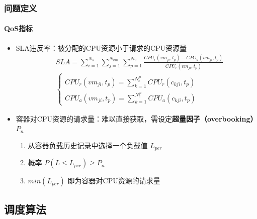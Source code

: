 \begin{frame}
\frametitle{问题定义}
\framesubtitle{QoS指标}
\begin{itemize}
    \item SLA违反率：被分配的CPU资源小于请求的CPU资源量
    \begin{equation}
    \begin{align*}
        &SLA = \sum_{i=1}^{N_s}\sum_{j=1}^{N_{vm}}\sum_{p=1}^{N_v}
        \frac{CPU_r(vm_{ji},t_p) - CPU_a(vm_{ji},t_p)}{CPU_r(vm_{ji},t_p)} \\
        &\begin{cases}
            CPU_r(vm_{ji},t_p) = \sum_{k=1}^{N_c^{ji}}CPU_r(c_{kji},t_p) \\
            CPU_a(vm_{ji},t_p) = \sum_{k=1}^{N_c^{ji}}CPU_a(c_{kji},t_p)
        \end{cases}
    \end{align*}
    \end{equation}
    \item 容器对CPU资源的请求量：难以直接获取，需设定\textbf{超量因子（overbooking）}$P_n$
        \begin{enumerate}
            \item 从容器负载历史记录中选择一个负载值 $L_{per}$
            \item 概率 $P(L \le L_{per}) \ge P_n$
            \item $min(L_{per})$ 即为容器对CPU资源的请求量
        \end{enumerate}
\end{itemize}
\end{frame}

\subsection{调度算法}

